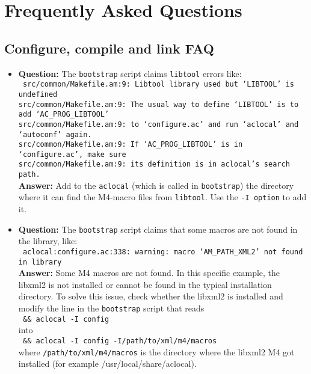 \chapter{Frequently Asked Questions}\label{sec:FAQ}

%


\section{Configure, compile and link FAQ}

\begin{itemize}

\item {\bf Question:} The {\tt bootstrap} script claims {\tt libtool} errors like:\\
      {\tt
      src/common/Makefile.am:9: Libtool library used but `LIBTOOL' is undefined\\
      src/common/Makefile.am:9:   The usual way to define `LIBTOOL' is to add `AC\_PROG\_LIBTOOL'\\
      src/common/Makefile.am:9:   to `configure.ac' and run `aclocal' and `autoconf' again.\\
      src/common/Makefile.am:9:   If `AC\_PROG\_LIBTOOL' is in `configure.ac', make sure\\
      src/common/Makefile.am:9:   its definition is in aclocal's search path.\\
      }
      {\bf Answer:  } Add to the {\tt aclocal} (which is called in {\tt bootstrap}) the directory where it can find the M4-macro files from {\tt libtool}. Use the {\tt -I option} to add it.

\item {\bf Question:} The {\tt bootstrap} script claims that some macros are not found in the library, like:\\
      {\tt
      aclocal:configure.ac:338: warning: macro `AM\_PATH\_XML2' not found in library\\
      }
      {\bf Answer:  } Some M4 macros are not found. In this specific example, the libxml2 is not installed or cannot be found in the typical installation directory. To solve this issue, check whether the libxml2 is installed and modify the line in the {\tt bootstrap} script that reads\\
      {\tt 
      \&\& aclocal -I config \ \\
      }
      into\\
      {\tt 
      \&\& aclocal -I config -I/path/to/xml/m4/macros \ \\
      }
      where {\tt /path/to/xml/m4/macros} is the directory where the libxml2 M4 got installed (for example /usr/local/share/aclocal).


\end{itemize}
